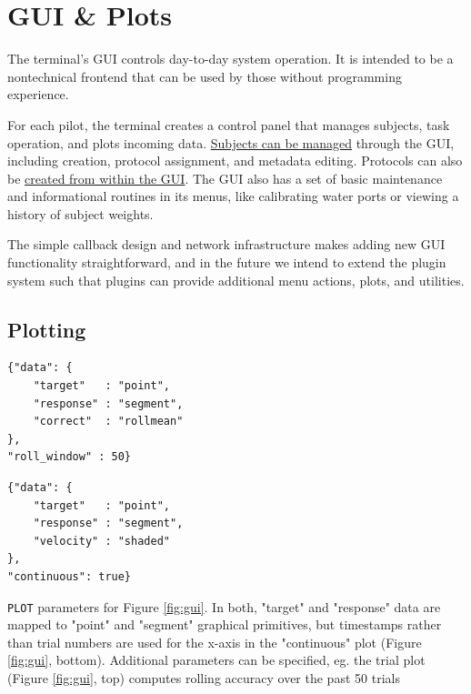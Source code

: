 \section{GUI \& Plots}
\label{sec:ui}

The terminal's GUI controls day-to-day system operation. It is intended to be a nontechnical frontend that can be used by those without programming experience. 

For each pilot, the terminal creates a control panel that manages subjects, task operation, and plots incoming data. \href{http://docs.auto-pi-lot.com/guide.training.html#creating-a-subject}{Subjects can be managed} through the GUI, including creation, protocol assignment, and metadata editing. Protocols can also be \href{http://docs.auto-pi-lot.com/guide.training.html#creating-a-protocol}{created from within the GUI}. The GUI also has a set of basic maintenance and informational routines in its menus, like calibrating water ports or viewing a history of subject weights. 

The simple callback design and network infrastructure makes adding new GUI functionality straightforward, and in the future we intend to extend the plugin system such that plugins can provide additional menu actions, plots, and utilities.

\subsection{Plotting}
\label{sec:plotting}

\begin{marginfigure}[-3.5cm]
\begin{verbatim}
{"data": {
    "target"   : "point",
    "response" : "segment",
    "correct"  : "rollmean"
},
"roll_window" : 50}
\end{verbatim}
\begin{verbatim}
{"data": {
    "target"   : "point",
    "response" : "segment",
    "velocity" : "shaded"
},
"continuous": true}
\end{verbatim}
\caption{\texttt{PLOT} parameters for Figure \ref{fig:gui}. In both, "target" and "response" data are mapped to "point" and "segment" graphical primitives, but timestamps rather than trial numbers are used for the x-axis in the "continuous" plot (Figure \ref{fig:gui}, bottom). Additional parameters can be specified, eg. the trial plot (Figure \ref{fig:gui}, top) computes rolling accuracy over the past 50 trials}
\label{fig:plotparams}
\end{marginfigure}

